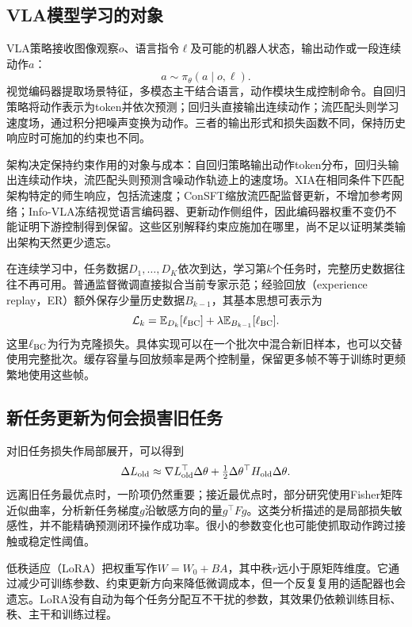 \documentclass[UTF8,11pt,a4paper,fontset=fandol]{ctexart}
\begin{document}
\subsection{VLA模型学习的对象}
VLA策略接收图像观察$o$、语言指令$\ell$及可能的机器人状态，输出动作或一段连续动作$a$：
\begin{equation}
a\sim\pi_\theta(a\mid o,\ell).
\end{equation}
视觉编码器提取场景特征，多模态主干结合语言，动作模块生成控制命令。自回归策略将动作表示为token并依次预测；回归头直接输出连续动作；流匹配头则学习速度场，通过积分把噪声变换为动作。三者的输出形式和损失函数不同，保持历史响应时可施加的约束也不同。

架构决定保持约束作用的对象与成本：自回归策略输出动作token分布，回归头输出连续动作块，流匹配头则预测含噪动作轨迹上的速度场。XIA在相同条件下匹配架构特定的师生响应，包括流速度；ConSFT缩放流匹配监督更新，不增加参考网络；Info-VLA冻结视觉语言编码器、更新动作侧组件，因此编码器权重不变仍不能证明下游控制得到保留。这些区别解释约束应施加在哪里，尚不足以证明某类输出架构天然更少遗忘\cite{xia,consft,info}。

在连续学习中，任务数据$D_1,\ldots,D_K$依次到达，学习第$k$个任务时，完整历史数据往往不再可用。普通监督微调直接拟合当前专家示范；经验回放（experience replay，ER）额外保存少量历史数据$B_{k-1}$，其基本思想可表示为
\begin{equation}
\mathcal L_k=\mathbb E_{D_k}[\ell_{\rm BC}]+\lambda\mathbb E_{B_{k-1}}[\ell_{\rm BC}].
\label{eq:er-zh}
\end{equation}
这里$\ell_{\rm BC}$为行为克隆损失。具体实现可以在一个批次中混合新旧样本，也可以交替使用完整批次。缓存容量与回放频率是两个控制量，保留更多帧不等于训练时更频繁地使用这些帧。

\subsection{新任务更新为何会损害旧任务}
对旧任务损失作局部展开，可以得到
\begin{equation}
\Delta L_{\rm old}\approx\nabla L_{\rm old}^{\top}\Delta\theta+
\tfrac12\Delta\theta^{\top}H_{\rm old}\Delta\theta.
\label{eq:taylor-zh}
\end{equation}
远离旧任务最优点时，一阶项仍然重要；接近最优点时，部分研究使用Fisher矩阵近似曲率，分析新任务梯度$g$沿敏感方向的量$g^{\top}Fg$\cite{hu_rl,consft}。这类分析描述的是局部损失敏感性，并不能精确预测闭环操作成功率。很小的参数变化也可能使抓取动作跨过接触或稳定性阈值。

低秩适应（LoRA）把权重写作$W=W_0+BA$，其中秩$r$远小于原矩阵维度。它通过减少可训练参数、约束更新方向来降低微调成本，但一个反复复用的适配器也会遗忘。LoRA没有自动为每个任务分配互不干扰的参数，其效果仍依赖训练目标、秩、主干和训练过程。
\end{document}

